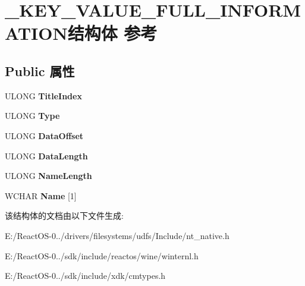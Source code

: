 \hypertarget{struct___k_e_y___v_a_l_u_e___f_u_l_l___i_n_f_o_r_m_a_t_i_o_n}{}\section{\+\_\+\+K\+E\+Y\+\_\+\+V\+A\+L\+U\+E\+\_\+\+F\+U\+L\+L\+\_\+\+I\+N\+F\+O\+R\+M\+A\+T\+I\+O\+N结构体 参考}
\label{struct___k_e_y___v_a_l_u_e___f_u_l_l___i_n_f_o_r_m_a_t_i_o_n}
\subsection*{Public 属性}
\begin{DoxyCompactItemize}
\item 
\mbox{\label{struct___k_e_y___v_a_l_u_e___f_u_l_l___i_n_f_o_r_m_a_t_i_o_n_a17e69c3557789b6f6dc0e914604be3dd}} 
U\+L\+O\+NG {\bfseries Title\+Index}
\item 
\mbox{\label{struct___k_e_y___v_a_l_u_e___f_u_l_l___i_n_f_o_r_m_a_t_i_o_n_a2d830e8dad303c46a6b9d5f159e59994}} 
U\+L\+O\+NG {\bfseries Type}
\item 
\mbox{\label{struct___k_e_y___v_a_l_u_e___f_u_l_l___i_n_f_o_r_m_a_t_i_o_n_a513fbe4d9ba9d970466025722570355a}} 
U\+L\+O\+NG {\bfseries Data\+Offset}
\item 
\mbox{\label{struct___k_e_y___v_a_l_u_e___f_u_l_l___i_n_f_o_r_m_a_t_i_o_n_a3e34c3d675c4b63a21771d4327866e36}} 
U\+L\+O\+NG {\bfseries Data\+Length}
\item 
\mbox{\label{struct___k_e_y___v_a_l_u_e___f_u_l_l___i_n_f_o_r_m_a_t_i_o_n_a670bfe92a5da1af545c889bfb869c73c}} 
U\+L\+O\+NG {\bfseries Name\+Length}
\item 
\mbox{\label{struct___k_e_y___v_a_l_u_e___f_u_l_l___i_n_f_o_r_m_a_t_i_o_n_a8f920dc35be5afd29e1a61a44c30b6de}} 
W\+C\+H\+AR {\bfseries Name} \mbox{[}1\mbox{]}
\end{DoxyCompactItemize}


该结构体的文档由以下文件生成\+:\begin{DoxyCompactItemize}
\item 
E\+:/\+React\+O\+S-\/0../drivers/filesystems/udfs/\+Include/nt\+\_\+native.\+h\item 
E\+:/\+React\+O\+S-\/0../sdk/include/reactos/wine/winternl.\+h\item 
E\+:/\+React\+O\+S-\/0../sdk/include/xdk/cmtypes.\+h\end{DoxyCompactItemize}
